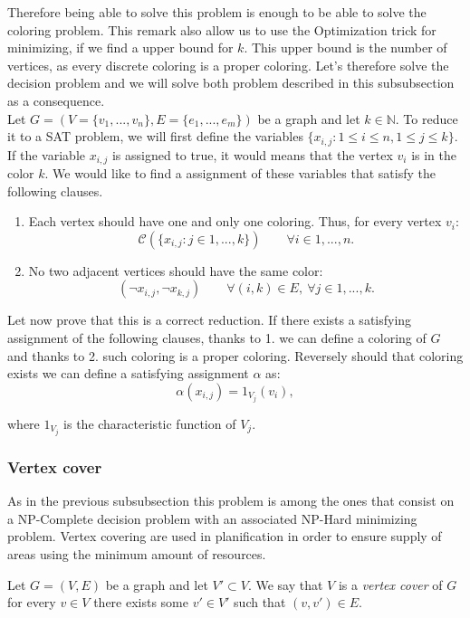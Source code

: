 Therefore being able to solve this problem is enough to be able to solve the coloring problem. This remark also allow us to use the Optimization trick for minimizing, if we find a upper bound for $k$. This upper bound  is the number of vertices, as every discrete coloring is a proper coloring. Let's therefore solve the decision problem and we will solve both problem described in this subsubsection as a consequence.\\

Let $G=(V=\{ v_1,...,v_n\},E= \{e_1,...,e_m\})$ be a graph and let $k\in \mathbb{N}$. To reduce it to a SAT problem, we will first define the variables $\{x_{i,j} : 1\le i \le n,  1 \le j \le k\}$. If the variable $x_{i,j}$ is assigned to true, it would means that the vertex $v_i$ is in the color $k$. We would like to find a assignment of these variables that satisfy the following clauses.
\begin{enumerate}
\item Each vertex should have one and only one coloring. Thus, for every vertex $v_i$:
  $$\mathcal{C}( \{x_{i,j} : j \in 1,...,k \}) \qquad \forall i \in 1,...,n.$$
\item No two adjacent vertices should have the same color:
$$(\neg x_{i,j}, \neg x_{k,j}) \qquad \forall (i,k) \in E,\ \forall j \in 1,...,k.$$
\end{enumerate}

Let now prove that this is a correct reduction. If there exists a satisfying assignment of the following clauses, thanks to 1. we can define a coloring of $G$ and thanks to 2. such coloring is a proper coloring. Reversely should that coloring exists we can define a satisfying assignment $\alpha$ as:
$$\alpha(x_{i,j}) = 1_{V_j} (v_i),$$

where $1_{V_j}$ is the characteristic function of $V_j$.


\subsubsection{Vertex cover}

As in the previous subsubsection this problem is among the ones that consist on a NP-Complete decision problem with an associated NP-Hard minimizing problem. Vertex covering are used in planification in order to ensure supply of areas using the minimum amount of resources. 

\begin{definition}
  Let $G=(V,E)$ be a graph and let $V' \subset V$. We say that $V$ is a \emph{vertex cover} of $G$ for every $v\in V$ there exists some $v'\in V' $ such that $(v,v')\in E$.
\end{definition}


